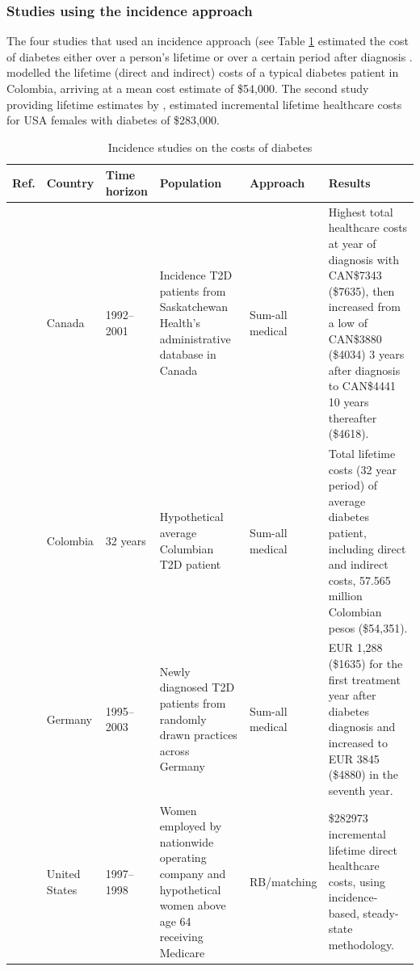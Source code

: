 \subsubsection*{Studies using the incidence approach}
The four studies that used an incidence approach (see Table \ref{tab:review_incidence} estimated the cost of diabetes either over a person's lifetime \parencite{Gonzalez2009b,Birnbaum2003c} or over a certain period after diagnosis \textcite{Johnson2006d,Martin2007b}. \textcite{Gonzalez2009b} modelled the lifetime (direct and indirect) costs of a typical diabetes patient in Colombia, arriving at a mean cost estimate of \$54,000. The second study providing lifetime estimates by \textcite{Birnbaum2003c}, estimated incremental lifetime healthcare costs for USA females with diabetes of \$283,000.


\begin{table}[p]
\centering
\footnotesize
\begin{tabularx}{\linewidth}{X X X X X X}
\caption{Incidence studies on the costs of diabetes}\label{tab:review_incidence}\\
\toprule
Ref. &  Country & Time horizon & Population & Approach & Results \\ 
\midrule 
\textcite{Johnson2006d} &  Canada & 1992--2001 & Incidence T2D patients from Saskatchewan Health's administrative database in Canada & Sum-all medical & Highest  total healthcare costs at year of diagnosis with CAN\$7343 (\$7635), then increased from a low of CAN\$3880 (\$4034) 3 years after diagnosis to CAN\$4441   10 years thereafter (\$4618). \\
	\textcite{Gonzalez2009b} & Colombia & 32 years & Hypothetical average Columbian T2D patient & Sum-all medical & Total lifetime costs (32 year  period) of average diabetes patient, including direct and indirect costs,  57.565 million Colombian pesos (\$54,351). \\
\textcite{Martin2007b} & Germany & 1995--2003 & Newly  diagnosed T2D patients from randomly drawn practices across Germany & Sum-all medical & EUR 1,288   (\$1635) for the first treatment year after diabetes diagnosis and increased   to EUR 3845 (\$4880) in the seventh year. \\
\textcite{Birnbaum2003c} & United  States & 1997--1998 & Women employed by nationwide operating company and hypothetical women above age 64 receiving Medicare & RB/matching & \$282973 incremental lifetime direct healthcare costs, using incidence-based, steady-state methodology. \\ \bottomrule
\end{tabularx}
\end{table}



